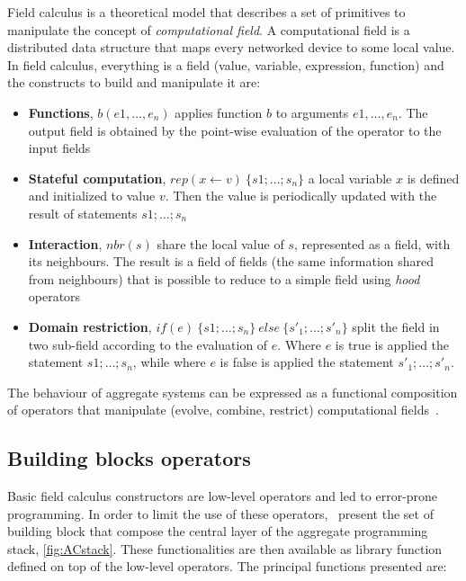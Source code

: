 Field calculus is a theoretical model that describes a set of primitives to manipulate the concept of \textit{computational field}. A computational field is a distributed data structure that maps every networked device to some local value. In field calculus, everything is a field (value, variable, expression, function) and the constructs to build and manipulate it are:
\begin{itemize}
    \item \textbf{Functions}, $b(e1,\dots,e_n)$ applies function $b$ to arguments $e1,\dots,e_n$. The output field is obtained by the point-wise evaluation of the operator to the input fields
    \item \textbf{Stateful computation}, $rep(x \leftarrow v)~\{s1; \dots ; s_n\}$ a local variable $x$ is defined and initialized to value $v$. Then the value is periodically updated with the result of statements $s1; \dots ; s_n$
    \item \textbf{Interaction}, $nbr(s)$ share the local value of $s$, represented as a field, with its neighbours. The result is a field of fields (the same information shared from neighbours) that is possible to reduce to a simple field using \textit{hood} operators
    \item \textbf{Domain restriction}, $if(e)~\{s1; \dots ; s_n\}~else~\{s'_1; \dots ; s'_n\}$ split the field in two sub-field according to the evaluation of $e$. Where $e$ is true is applied the statement $s1; \dots ; s_n$, while where $e$ is false is applied the statement $s'_1; \dots ; s'_n$.
\end{itemize}

The behaviour of aggregate systems can be expressed as a functional composition of operators that manipulate (evolve, combine, restrict) computational fields~\cite{type-sound}.

\subsection{Building blocks operators}
Basic field calculus constructors are low-level operators and led to error-prone programming. In order to limit the use of these  operators,~\cite{buildingBlock} present the set of building block that compose the central layer of the aggregate programming stack, \autoref{fig:ACstack}. These functionalities are then available as library function defined on top of the low-level operators. The principal functions presented are:

